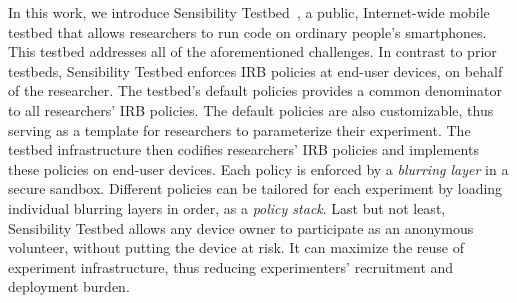 In this work, we introduce 
Sensibility Testbed~\cite{sensibility, zhuang2015privacy}, a public, 
Internet-wide mobile testbed that allows researchers to run code on ordinary
people's smartphones. This testbed addresses all of the 
aforementioned challenges.
%   
In contrast to prior testbeds, Sensibility Testbed enforces IRB policies
at end-user devices, on behalf of the researcher. The testbed's 
default policies provides a common denominator to all researchers' 
IRB policies. %
The default policies are also customizable, thus serving as a template 
for researchers to parameterize their experiment. The testbed 
infrastructure then codifies researchers' IRB policies and 
implements these policies on end-user devices. Each 
policy is enforced by a \textit{blurring layer} in a secure 
sandbox. Different policies can be tailored for each experiment by loading
individual blurring layers in order, as a \textit{policy stack}. 
Last but not least, Sensibility Testbed allows
any device owner to participate as an anonymous volunteer,
without putting the device at risk. It can  
maximize the reuse of experiment infrastructure, thus reducing 
experimenters' recruitment and deployment burden. 
%
%
%
%
			
